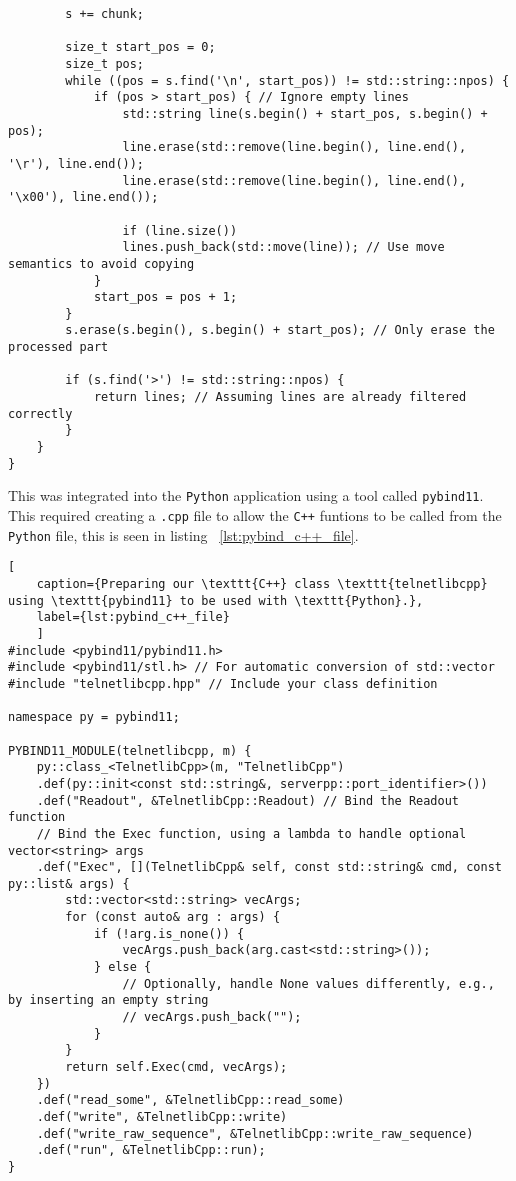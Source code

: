 \begin{lstlisting}
		s += chunk;
		
		size_t start_pos = 0;
		size_t pos;
		while ((pos = s.find('\n', start_pos)) != std::string::npos) {
			if (pos > start_pos) { // Ignore empty lines
				std::string line(s.begin() + start_pos, s.begin() + pos);
				line.erase(std::remove(line.begin(), line.end(), '\r'), line.end());
				line.erase(std::remove(line.begin(), line.end(), '\x00'), line.end());
				
				if (line.size())
				lines.push_back(std::move(line)); // Use move semantics to avoid copying
			}
			start_pos = pos + 1;
		}
		s.erase(s.begin(), s.begin() + start_pos); // Only erase the processed part
		
		if (s.find('>') != std::string::npos) {
			return lines; // Assuming lines are already filtered correctly
		}
	}
}

\end{lstlisting}

This was integrated into the \texttt{Python} application using a tool called \texttt{pybind11}. This required creating a \texttt{.cpp} file to allow the \texttt{C++} funtions to be called from the \texttt{Python} file, this is seen in listing ~\ref{lst:pybind_c++_file}.

\begin{lstlisting}[
	caption={Preparing our \texttt{C++} class \texttt{telnetlibcpp} using \texttt{pybind11} to be used with \texttt{Python}.},
	label={lst:pybind_c++_file}
	]
#include <pybind11/pybind11.h>
#include <pybind11/stl.h> // For automatic conversion of std::vector
#include "telnetlibcpp.hpp" // Include your class definition

namespace py = pybind11;

PYBIND11_MODULE(telnetlibcpp, m) {
	py::class_<TelnetlibCpp>(m, "TelnetlibCpp")
	.def(py::init<const std::string&, serverpp::port_identifier>())
	.def("Readout", &TelnetlibCpp::Readout) // Bind the Readout function
	// Bind the Exec function, using a lambda to handle optional vector<string> args
	.def("Exec", [](TelnetlibCpp& self, const std::string& cmd, const py::list& args) {
		std::vector<std::string> vecArgs;
		for (const auto& arg : args) {
			if (!arg.is_none()) {
				vecArgs.push_back(arg.cast<std::string>());
			} else {
				// Optionally, handle None values differently, e.g., by inserting an empty string
				// vecArgs.push_back("");
			}
		}
		return self.Exec(cmd, vecArgs);
	})
	.def("read_some", &TelnetlibCpp::read_some)
	.def("write", &TelnetlibCpp::write)
	.def("write_raw_sequence", &TelnetlibCpp::write_raw_sequence)
	.def("run", &TelnetlibCpp::run);
}
\end{lstlisting}

